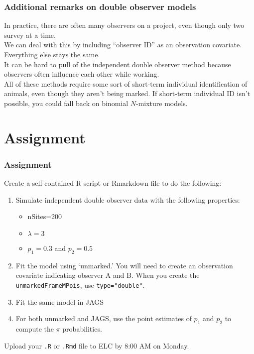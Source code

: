 \documentclass[color=usenames,dvipsnames]{beamer}\usepackage[]{graphicx}\usepackage[]{xcolor}
\newcommand{\inr}[1]{\colorbox{inlinecolor}{\texttt{#1}}}
\begin{document}






\begin{frame}
  \frametitle{Additional remarks on double observer models}
  In practice, there are often many observers on a project, even
  though only two survey at a time. \\
  \pause
  \vfill
  We can deal with this by including ``observer ID'' as an observation
  covariate. Everything else stays the same. \\
  \pause
  \vfill
  It can be hard to pull of the independent double observer method
  because observers often influence each other while working. \\
  \pause
  \vfill
  All of these methods require some sort of \alert{short-term}
  individual identification of animals, even though they aren't being
  marked.
  \pause
  \vfill
  If short-term individual ID isn't possible, you could fall
  back on binomial $N$-mixture models.
\end{frame}




\section{Assignment}




\begin{frame}[fragile]
  \frametitle{Assignment}
  \small
  Create a self-contained R script or Rmarkdown file
  to do the following:
  \vfill
  \begin{enumerate}
    \small
    \item Simulate \alert{independent} double observer data with the following
      properties:
      \begin{itemize}
        \item nSites=200
        \item $\lambda=3$
        \item $p_1=0.3$ and $p_2=0.5$
      \end{itemize}
    \item Fit the model using `unmarked.' You will need to create an
      observation covariate indicating observer A and B. When you
      create the \inr{unmarkedFrameMPois}, use \inr{type="double"}.
    \item Fit the same model in JAGS
    \item For both unmarked and JAGS, use the point estimates of $p_1$
      and $p_2$ to compute the $\pi$ probabilities.  
  \end{enumerate}
  \vfill
  Upload your {\tt .R} or {\tt .Rmd} file to ELC by 8:00 AM on Monday.
\end{frame}
\end{document}
